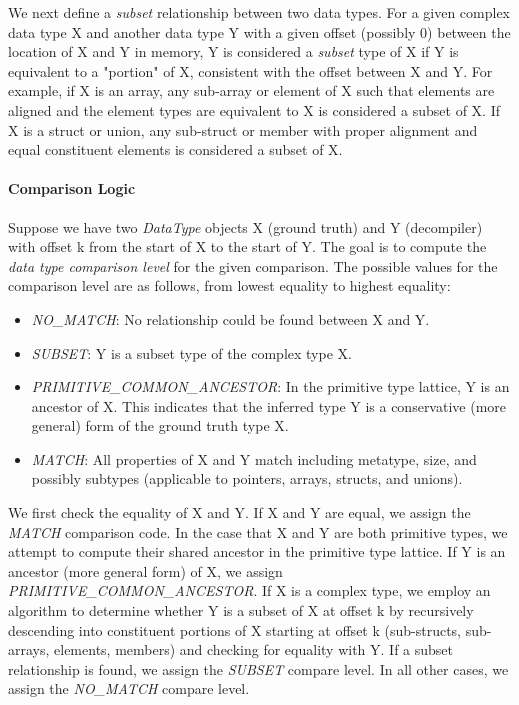 \documentclass[a4paper,twoside]{article}
\begin{document}
We next define a \emph{subset} relationship between two data types. For a given complex data type X and another data type Y with a given offset (possibly 0) between the location of X and Y in memory, Y is considered a \emph{subset} type of X if Y is equivalent to a "portion" of X, consistent with the offset between X and Y. For example, if X is an array, any sub-array or element of X such that elements are aligned and the element types are equivalent to X is considered a subset of X. If X is a struct or union, any sub-struct or member with proper alignment and equal constituent elements is considered a subset of X.

\paragraph{Comparison Logic}

Suppose we have two \emph{DataType} objects X (ground truth) and Y (decompiler) with offset k from the start of X to the start of Y. The goal is to compute the \emph{data type comparison level} for the given comparison. The possible values for the comparison level are as follows, from lowest equality to highest equality:

\begin{itemize}
    \item \emph{NO\_MATCH}: No relationship could be found between X and Y.
    \item \emph{SUBSET}: Y is a subset type of the complex type X.
    \item \emph{PRIMITIVE\_COMMON\_ANCESTOR}: In the primitive type lattice, Y is an ancestor of X. This indicates that the inferred type Y is a conservative (more general) form of the ground truth type X.
    \item \emph{MATCH}: All properties of X and Y match including metatype, size, and possibly subtypes (applicable to pointers, arrays, structs, and unions).
\end{itemize}

We first check the equality of X and Y. If X and Y are equal, we assign the \emph{MATCH} comparison code. In the case that X and Y are both primitive types, we attempt to compute their shared ancestor in the primitive type lattice. If Y is an ancestor (more general form) of X, we assign \emph{PRIMITIVE\_COMMON\_ANCESTOR}. If X is a complex type, we employ an algorithm to determine whether Y is a subset of X at offset k by recursively descending into constituent portions of X starting at offset k (sub-structs, sub-arrays, elements, members) and checking for equality with Y. If a subset relationship is found, we assign the \emph{SUBSET} compare level. In all other cases, we assign the \emph{NO\_MATCH} compare level.
\end{document}
